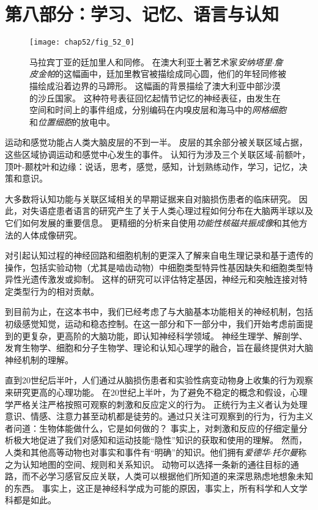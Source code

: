 \chapter*{第八部分：学习、记忆、语言与认知}


\begin{figure}[htbp]
	\centering
	\texttt{[image: chap52/fig\_52\_0]}
	\caption{马拉宾丁亚的廷加里人和同修。
		在澳大利亚土著艺术家\textit{安纳塔里$\cdot$詹皮金帕}的这幅画中，廷加里教官被描绘成同心圆，他们的年轻同修被描绘成沿着边界的马蹄形。
		这幅画的背景描绘了澳大利亚中部沙漠的沙丘国家。
		这种符号表征回忆起情节记忆的神经表征，由发生在空间和时间上的事件组成，分别编码在内嗅皮层和海马中的\textit{网格细胞}和\textit{位置细胞}的放电中。}
	\label{fig:52_0}
\end{figure}


运动和感觉功能占人类大脑皮层的不到一半。
皮层的其余部分被关联区域占据，这些区域协调运动和感觉中心发生的事件。
认知行为涉及三个关联区域-前额叶，顶叶-颞枕叶和边缘：说话，思考，感觉，感知，计划熟练动作，学习，记忆，决策和意识。


大多数将认知功能与关联区域相关的早期证据来自对脑损伤患者的临床研究。
因此，对失语症患者语言的研究产生了关于人类心理过程如何分布在大脑两半球以及它们如何发展的重要信息。
更精细的分析来自使用\textit{功能性核磁共振成像}和其他方法的人体成像研究。


对引起认知过程的神经回路和细胞机制的更深入了解来自电生理记录和基于遗传的操作，包括实验动物（尤其是啮齿动物）中细胞类型特异性基因缺失和细胞类型特异性光遗传激发或抑制。
这样的研究可以评估特定基因，神经元和突触连接对特定类型行为的相对贡献。


到目前为止，在这本书中，我们已经考虑了与大脑基本功能相关的神经机制，包括初级感觉知觉，运动和稳态控制。在这一部分和下一部分中，我们开始考虑前面提到的更复杂，更高阶的大脑功能，即认知神经科学领域。
神经生理学、解剖学、发育生物学、细胞和分子生物学、理论和认知心理学的融合，旨在最终提供对大脑神经机制的理解。


直到20世纪后半叶，人们通过从脑损伤患者和实验性病变动物身上收集的行为观察来研究更高的心理功能。
在20世纪上半叶，为了避免不稳定的概念和假设，心理学严格关注严格按照可观察的刺激和反应定义的行为。
正统行为主义者认为处理意识、情感、注意力甚至动机都是徒劳的。通过只关注可观察到的行为，行为主义者问道：生物体能做什么，它是如何做的？
事实上，对刺激和反应的仔细定量分析极大地促进了我们对感知和运动技能“隐性”知识的获取和使用的理解。
然而，人类和其他高等动物也对事实和事件有“明确”的知识。他们拥有\textit{爱德华$\cdot$托尔曼}称之为认知地图的空间、规则和关系知识。
动物可以选择一条新的通往目标的通路，而不必学习感官反应关联，人类可以根据他们所知道的来深思熟虑地想象未知的东西。
事实上，这正是神经科学成为可能的原因，事实上，所有科学和人文学科都是如此。


